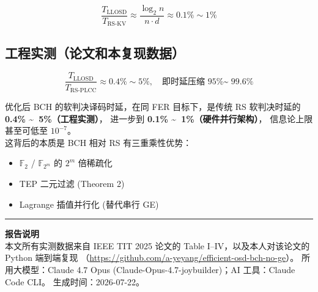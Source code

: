\documentclass[11pt,a4paper]{article}
\begin{document}
\begin{equation}
\boxed{\frac{T_{\text{LLOSD}}}{T_{\text{RS-KV}}} \approx \frac{\log_2 n}{n\cdot d}
\approx 0.1\% \sim 1\%}
\end{equation}

\subsection{工程实测（论文和本复现数据）}

\begin{equation}
\boxed{\frac{T_{\text{LLOSD}}}{T_{\text{RS-PLCC}}}
\approx 0.4\% \sim 5\%, \quad \text{即时延压缩 95\% \textasciitilde\ 99.6\%}}
\end{equation}

\vspace{6pt}

\begin{concludebox}[title=\textbf{一句话回答}]
优化后 BCH 的软判决译码时延，在同 FER 目标下，是传统 RS 软判决时延的
\textbf{0.4\% \textasciitilde\ 5\%（工程实测）}，
进一步到 \textbf{0.1\% \textasciitilde\ 1\%（硬件并行架构）}，
信息论上限甚至可低至 $10^{-7}$。\\[3pt]

这背后的本质是 BCH 相对 RS 有三重乘性优势：
\begin{itemize}[leftmargin=1em, itemsep=1pt, topsep=2pt]
\item $\mathbb{F}_2$ / $\mathbb{F}_{2^m}$ 的 $2^m$ 倍稀疏化
\item TEP 二元过滤 (Theorem 2)
\item Lagrange 插值并行化 (替代串行 GE)
\end{itemize}
\end{concludebox}

\vspace{10pt}
\hrule
\vspace{4pt}
\noindent\footnotesize{
\textbf{报告说明}\\
本文所有实测数据来自 IEEE TIT 2025 论文的 Table I–IV，以及本人对该论文的 Python 端到端复现
（\url{https://github.com/a-yeyang/efficient-osd-bch-no-ge}）。
所用大模型：Claude 4.7 Opus (Claude-Opus-4.7-joybuilder)；AI 工具：Claude Code CLI。
生成时间：2026-07-22。
}
\end{document}
